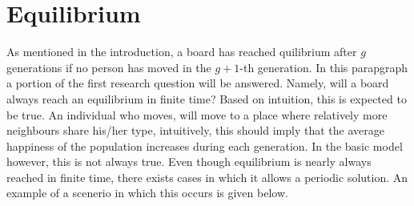 
\section{Equilibrium}\label{sec:equi}
As mentioned in the introduction, a board has reached quilibrium after $g$ generations if no  person has moved in the $g+1$-th generation.
In this parapgraph a portion of the first research question will be answered. Namely, will a board always reach an equilibrium in finite time? 
Based on intuition, this is expected to be true.
An individual who moves, will move to a place where relatively more neighbours share his/her type, intuitively, this should imply that the average happiness of the population increases during each generation. 
In the basic model however, this is not always true. 
Even though equilibrium is nearly always reached in finite time, there exists cases in which it allows a periodic solution. 
An example of a scenerio in which this occurs is given below.

